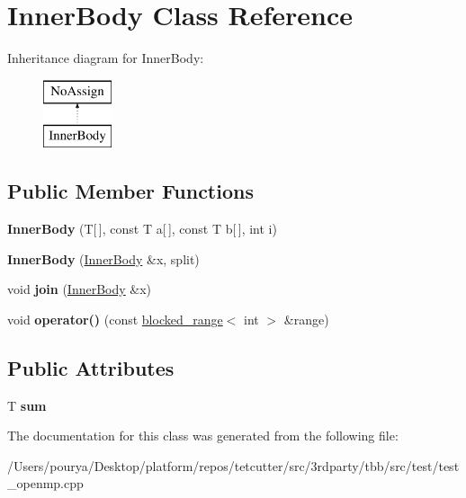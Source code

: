 \hypertarget{classInnerBody}{}\section{Inner\+Body Class Reference}
\label{classInnerBody}
Inheritance diagram for Inner\+Body\+:\begin{figure}[H]
\begin{center}
\leavevmode
\includegraphics[height=2.000000cm]{classInnerBody}
\end{center}
\end{figure}
\subsection*{Public Member Functions}
\begin{DoxyCompactItemize}
\item 
\hypertarget{classInnerBody_ace2dce692fdc3df6aaf4d2c59eea9e67}{}{\bfseries Inner\+Body} (T\mbox{[}$\,$\mbox{]}, const T a\mbox{[}$\,$\mbox{]}, const T b\mbox{[}$\,$\mbox{]}, int i)\label{classInnerBody_ace2dce692fdc3df6aaf4d2c59eea9e67}

\item 
\hypertarget{classInnerBody_a667d5efda283aa2d39ca42fa35e17e0c}{}{\bfseries Inner\+Body} (\hyperlink{classInnerBody}{Inner\+Body} \&x, split)\label{classInnerBody_a667d5efda283aa2d39ca42fa35e17e0c}

\item 
\hypertarget{classInnerBody_aac8c2e7588d2aac9d09f1f07dbed3827}{}void {\bfseries join} (\hyperlink{classInnerBody}{Inner\+Body} \&x)\label{classInnerBody_aac8c2e7588d2aac9d09f1f07dbed3827}

\item 
\hypertarget{classInnerBody_aafcbc92106d4547322a580e236a24418}{}void {\bfseries operator()} (const \hyperlink{classtbb_1_1blocked__range}{blocked\+\_\+range}$<$ int $>$ \&range)\label{classInnerBody_aafcbc92106d4547322a580e236a24418}

\end{DoxyCompactItemize}
\subsection*{Public Attributes}
\begin{DoxyCompactItemize}
\item 
\hypertarget{classInnerBody_a5da1fdd657c04856ac4f9f120dda96ff}{}T {\bfseries sum}\label{classInnerBody_a5da1fdd657c04856ac4f9f120dda96ff}

\end{DoxyCompactItemize}


The documentation for this class was generated from the following file\+:\begin{DoxyCompactItemize}
\item 
/\+Users/pourya/\+Desktop/platform/repos/tetcutter/src/3rdparty/tbb/src/test/test\+\_\+openmp.\+cpp\end{DoxyCompactItemize}
